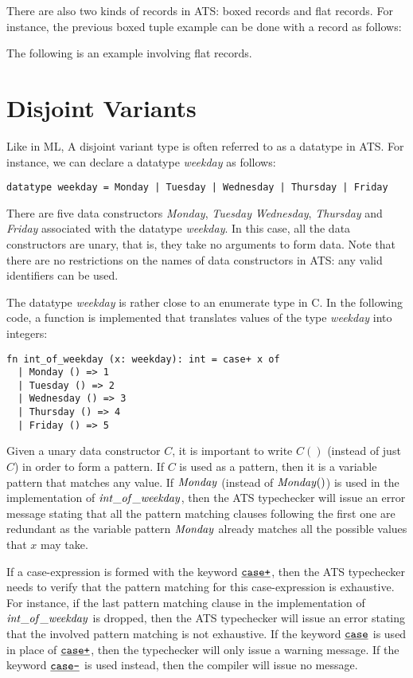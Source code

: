 There are also two kinds of records in ATS: boxed records and flat records.
For instance, the previous boxed tuple example can be done with a record as
follows:

The following is an example involving flat records.


\section{Disjoint Variants}

Like in ML, A disjoint variant type is often referred to as a datatype in
ATS. For instance, we can declare a datatype {\it weekday} as follows:
\begin{verbatim}
datatype weekday = Monday | Tuesday | Wednesday | Thursday | Friday
\end{verbatim}
There are five data constructors {\it Monday}, {\it Tuesday} {\it
Wednesday}, {\it Thursday} and {\it Friday} associated with the datatype
{\it\blue weekday}. In this case, all the data constructors are unary, that
is, they take no arguments to form data. Note that there are no
restrictions on the names of data constructors in ATS: any valid
identifiers can be used.

The datatype {\it weekday} is rather close to an enumerate type in C. In
the following code, a function is implemented that translates values
of the type {\it weekday} into integers:
\begin{verbatim}
fn int_of_weekday (x: weekday): int = case+ x of
  | Monday () => 1
  | Tuesday () => 2
  | Wednesday () => 3
  | Thursday () => 4
  | Friday () => 5
\end{verbatim}
Given a unary data constructor $C$, it is important to write $C()$ (instead
of just $C$) in order to form a pattern. If $C$ is used as a pattern, then
it is a variable pattern that matches any value. If ${\it Monday}$ (instead
of ${\it Monday ()}$) is used in the implementation of ${\it
int\_of\_weekday}$, then the ATS typechecker will issue an error message
stating that all the pattern matching clauses following the first one are
redundant as the variable pattern ${\it Monday}$ already matches all the
possible values that $x$ may take.

If a case-expression is formed with the keyword $\underline{\texttt{case+}}$, then the ATS
typechecker needs to verify that the pattern matching for this
case-expression is exhaustive. For instance, if the last pattern matching
clause in the implementation of ${\it int\_of\_weekday}$ is dropped, then
the ATS typechecker will issue an error stating that the involved pattern
matching is not exhaustive. If the keyword $\underline{\texttt{case}}$ is used in place of
$\underline{\texttt{case+}}$, then the typechecker will only issue a warning message. If
the keyword $\underline{\texttt{case-}}$ is used instead, then the compiler will issue no
message.

